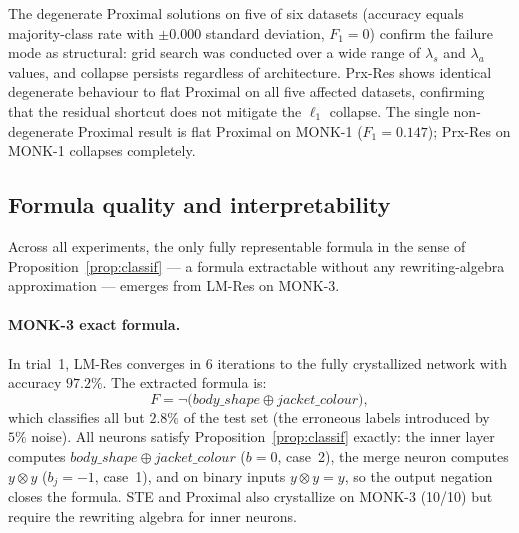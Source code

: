\documentclass[lettersize,journal]{IEEEtran}
\newcommand{\tnorm}{\otimes}      %
\newcommand{\disj}{\oplus}        %
\begin{document}
The degenerate Proximal solutions on five of six datasets (accuracy equals
majority-class rate with $\pm 0.000$ standard deviation, $F_1 = 0$) confirm
the failure mode as structural: grid search was conducted over a wide range of
$\lambda_s$ and $\lambda_a$ values, and collapse persists regardless of
architecture.
Prx-Res shows identical degenerate behaviour to flat Proximal on all five
affected datasets, confirming that the residual shortcut does not mitigate the
$\ell_1$ collapse.
The single non-degenerate Proximal result is flat Proximal on MONK-1 ($F_1 =
0.147$); Prx-Res on MONK-1 collapses completely.

\subsection{Formula quality and interpretability}
\label{ssec:formulas}

Across all experiments, the only fully representable formula in the sense of
Proposition~\ref{prop:classif} --- a formula extractable without any
rewriting-algebra approximation --- emerges from LM-Res on MONK-3.

\paragraph{MONK-3 exact formula.}
In trial~1, LM-Res converges in $6$ iterations to the fully crystallized
network with accuracy $97.2\%$.
The extracted formula is:
\begin{equation}
  F = \neg\!\bigl(\mathit{body\_shape} \disj \mathit{jacket\_colour}\bigr),
  \label{eq:monk3formula}
\end{equation}
which classifies all but $2.8\%$ of the test set (the erroneous labels
introduced by $5\%$ noise).
All neurons satisfy Proposition~\ref{prop:classif} exactly: the inner layer
computes $\mathit{body\_shape} \disj \mathit{jacket\_colour}$ ($b=0$, case~2),
the merge neuron computes $y \tnorm y$ ($b_j=-1$, case~1), and on binary inputs
$y \tnorm y = y$, so the output negation closes the formula.
STE and Proximal also crystallize on MONK-3 (10/10) but require the rewriting
algebra for inner neurons.
\end{document}
